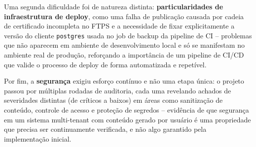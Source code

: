 \documentclass[12pt]{article}
\begin{document}
Uma segunda dificuldade foi de natureza distinta: \textbf{particularidades de infraestrutura de deploy}, como uma falha de publicação causada por cadeia de certificado incompleta no FTPS e a necessidade de fixar explicitamente a versão do cliente \texttt{postgres} usada no job de backup da pipeline de CI -- problemas que não aparecem em ambiente de desenvolvimento local e só se manifestam no ambiente real de produção, reforçando a importância de um pipeline de CI/CD que valide o processo de deploy de forma automatizada e repetível.

Por fim, a \textbf{segurança} exigiu esforço contínuo e não uma etapa única: o projeto passou por múltiplas rodadas de auditoria, cada uma revelando achados de severidades distintas (de críticos a baixos) em áreas como sanitização de conteúdo, controle de acesso e proteção de segredos -- evidência de que segurança em um sistema multi-tenant com conteúdo gerado por usuário é uma propriedade que precisa ser continuamente verificada, e não algo garantido pela implementação inicial.



\end{document}
